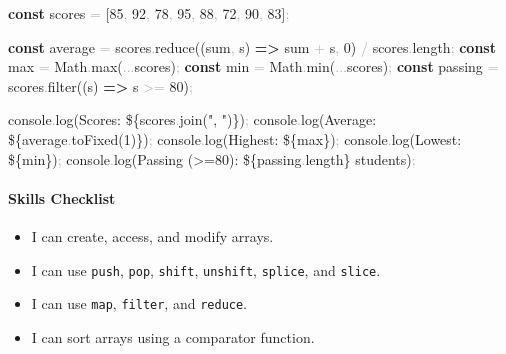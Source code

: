 \documentclass[
  justified,
  openright,
]{tufte-book}
\let\subsection\paragraph
\let\paragraph\paragraph
\newcommand{\KeywordTok}[1]{\textcolor{CodeKeyword}{\textbf{#1}}}  %
\newcommand{\StringTok}[1]{\textcolor{CodeString}{#1}}              %
\newcommand{\CodeNumTok}[1]{\textcolor{CodeNumber}{#1}}             %
\newcommand{\CodeFuncTok}[1]{\textcolor{CodeKeyword}{#1}}           %
\newcommand{\CodeTypeTok}[1]{\textcolor{CodeType}{#1}}              %
\newcommand{\OperatorTok}[1]{\textcolor{DarkGray}{#1}}              %
\newenvironment{Shaded}{%
  \begin{mdframed}[style=TufteCode]%
}{%
  \end{mdframed}%
}
\let\subsection\paragraph
\let\paragraph\paragraph
\providecommand{\tightlist}{%
  \setlength{\itemsep}{0pt}\setlength{\parskip}{0pt}}
\begin{document}
\begin{Shaded}
\begin{Highlighting}[]
\KeywordTok{const} scores \OperatorTok{=} [\CodeNumTok{85}\OperatorTok{,} \CodeNumTok{92}\OperatorTok{,} \CodeNumTok{78}\OperatorTok{,} \CodeNumTok{95}\OperatorTok{,} \CodeNumTok{88}\OperatorTok{,} \CodeNumTok{72}\OperatorTok{,} \CodeNumTok{90}\OperatorTok{,} \CodeNumTok{83}]\OperatorTok{;}
 
\KeywordTok{const} average \OperatorTok{=} scores\OperatorTok{.}\CodeFuncTok{reduce}((sum\OperatorTok{,} s) \KeywordTok{=\textgreater{}} sum \OperatorTok{+} s\OperatorTok{,} \CodeNumTok{0}) \OperatorTok{/} scores\OperatorTok{.}\CodeTypeTok{length}\OperatorTok{;}
\KeywordTok{const} max \OperatorTok{=} Math\OperatorTok{.}\CodeFuncTok{max}(\OperatorTok{...}scores)\OperatorTok{;}
\KeywordTok{const} min \OperatorTok{=} Math\OperatorTok{.}\CodeFuncTok{min}(\OperatorTok{...}scores)\OperatorTok{;}
\KeywordTok{const} passing \OperatorTok{=} scores\OperatorTok{.}\CodeFuncTok{filter}((s) \KeywordTok{=\textgreater{}} s \OperatorTok{\textgreater{}=} \CodeNumTok{80})\OperatorTok{;}
 
console\OperatorTok{.}\CodeFuncTok{log}(\StringTok{\textasciigrave{}Scores: }\StringTok{\$\{}scores\OperatorTok{.}\CodeFuncTok{join}(\StringTok{", "})\StringTok{\}}\StringTok{\textasciigrave{}})\OperatorTok{;}
console\OperatorTok{.}\CodeFuncTok{log}(\StringTok{\textasciigrave{}Average: }\StringTok{\$\{}average\OperatorTok{.}\CodeFuncTok{toFixed}(\CodeNumTok{1})\StringTok{\}}\StringTok{\textasciigrave{}})\OperatorTok{;}
console\OperatorTok{.}\CodeFuncTok{log}(\StringTok{\textasciigrave{}Highest: }\StringTok{\$\{}max\StringTok{\}}\StringTok{\textasciigrave{}})\OperatorTok{;}
console\OperatorTok{.}\CodeFuncTok{log}(\StringTok{\textasciigrave{}Lowest: }\StringTok{\$\{}min\StringTok{\}}\StringTok{\textasciigrave{}})\OperatorTok{;}
console\OperatorTok{.}\CodeFuncTok{log}(\StringTok{\textasciigrave{}Passing (\textgreater{}=80): }\StringTok{\$\{}passing\OperatorTok{.}\CodeTypeTok{length}\StringTok{\}}\StringTok{ students\textasciigrave{}})\OperatorTok{;}
\end{Highlighting}
\end{Shaded}

\subsection{Skills Checklist}\label{skills-checklist-60}

\begin{itemize}
\tightlist
\item[$\square$]
  I can create, access, and modify arrays.
\item[$\square$]
  I can use \texttt{push}, \texttt{pop}, \texttt{shift},
  \texttt{unshift}, \texttt{splice}, and \texttt{slice}.
\item[$\square$]
  I can use \texttt{map}, \texttt{filter}, and \texttt{reduce}.
\item[$\square$]
  I can sort arrays using a comparator function.
\end{itemize}
\end{document}
